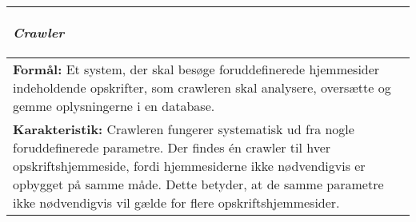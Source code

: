   \begin{tabular}{p{\textwidth}}
    \hline
    \begin{center} \textbf{\textit{Crawler}} \end{center} \\ \hline
    \textbf{Formål:} Et system, der skal besøge foruddefinerede hjemmesider indeholdende opskrifter, som crawleren skal analysere, oversætte og gemme oplysningerne i en database. \\ 
    \textbf{Karakteristik:} Crawleren fungerer systematisk ud fra nogle foruddefinerede parametre. Der findes én crawler til hver opskriftshjemmeside, fordi hjemmesiderne ikke nødvendigvis er opbygget på samme måde. Dette betyder, at de samme parametre ikke nødvendigvis vil gælde for flere opskriftshjemmesider. \\ \hline
  \end{tabular}

